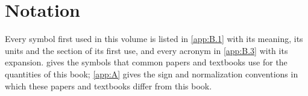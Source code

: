 \chapter{Notation}\label{app:B}
Every symbol first used in this volume is listed in \cref{app:B.1} with its meaning, its units and the section of its first use, and every acronym in \cref{app:B.3} with its expansion.  gives the symbols that common papers and textbooks use for the quantities of this book; \cref{app:A} gives the sign and normalization conventions in which these papers and textbooks differ from this book.



\printbibliography[heading=subbibliography]
